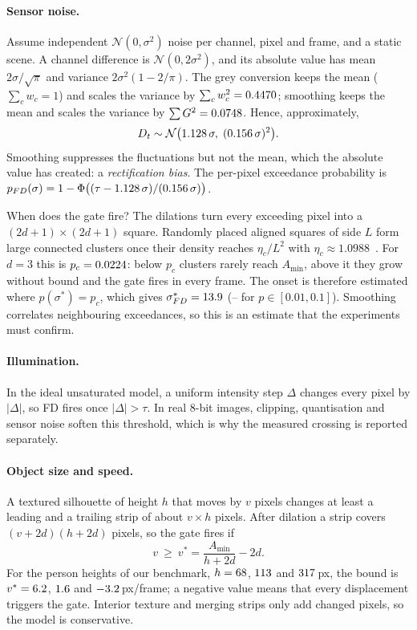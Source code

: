 \documentclass[12pt,a4paper]{article}
\theoremstyle{plain}
\theoremstyle{definition}
\newcommand{\FD}{FD}
\begin{document}
\paragraph{Sensor noise.} Assume independent $\mathcal{N}(0,\sigma^2)$ noise per channel, pixel and frame, and a static scene. A channel difference is $\mathcal{N}(0,2\sigma^2)$, and its absolute value has mean $2\sigma/\sqrt{\pi}$ and variance $2\sigma^2(1-2/\pi)$. The grey conversion keeps the mean ($\sum_c w_c=1$) and scales the variance by $\sum_c w_c^2=0.4470$; smoothing keeps the mean and scales the variance by $\sum G^2=0.0748$. Hence, approximately,
\begin{equation}\label{eq:bias}
D_t\sim\mathcal{N}\bigl(1.128\,\sigma,\;(0.156\,\sigma)^2\bigr).
\end{equation}
Smoothing suppresses the fluctuations but not the mean, which the absolute value has created: a \emph{rectification bias}. The per-pixel exceedance probability is $p_{\FD}(\sigma)=1-\Phi\bigl((\tau-\BiasCoef\,\sigma)/(\ClassicSdCoef\,\sigma)\bigr)$.

When does the gate fire? The dilations turn every exceeding pixel into a $(2d+1)\times(2d+1)$ square. Randomly placed aligned squares of side $L$ form large connected clusters once their density reaches $\eta_c/L^2$ with $\eta_c\approx1.0988$~\cite{mertens2012continuum}. For $d=3$ this is $p_c=0.0224$: below $p_c$ clusters rarely reach $A_{\min}$, above it they grow without bound and the gate fires in every frame. The onset is therefore estimated where $p(\sigma^*)=p_c$, which gives $\sigma^*_{\FD}=\PredSigmaPcFD$ (\PredSigmaLoFD--\PredSigmaHiFD{} for $p\in[0.01,0.1]$). Smoothing correlates neighbouring exceedances, so this is an estimate that the experiments must confirm.

\paragraph{Illumination.} In the ideal unsaturated model, a uniform intensity step $\Delta$ changes every pixel by $|\Delta|$, so \FD{} fires once $|\Delta|>\tau$. In real 8-bit images, clipping, quantisation and sensor noise soften this threshold, which is why the measured crossing is reported separately.

\paragraph{Object size and speed.} A textured silhouette of height $h$ that moves by $v$ pixels changes at least a leading and a trailing strip of about $v\times h$ pixels. After dilation a strip covers $(v+2d)(h+2d)$ pixels, so the gate fires if
\begin{equation}\label{eq:area}
v\ \ge\ v^*=\frac{A_{\min}}{h+2d}-2d .
\end{equation}
For the person heights of our benchmark, $h=68$, $113$ and $317$\,px, the bound is $v^*=6.2$, $1.6$ and $-3.2$\,px/frame; a negative value means that every displacement triggers the gate. Interior texture and merging strips only add changed pixels, so the model is conservative.
\end{document}
